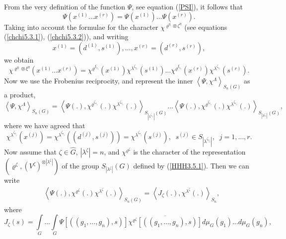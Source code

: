 \documentclass[12pt]{amsart}
\theoremstyle{definition}
\numberwithin{equation}{section}
\begin{document}
From the very definition of the function $\Psi$, see equation (\ref{PSI}), it follows that
\begin{equation}\label{PT1}
\Psi(x^{(1)}\ldots x^{(r)})=\Psi(x^{(1)})\ldots\Psi(x^{(r)}).
\end{equation}
Taking into account the formulae for the character $\chi^{\varrho^{\eta}\otimes\zeta^{\eta}}$ (see equations
(\ref{chchi5.3.1}), (\ref{chchi5.3.2})), and writing
$$
x^{(1)}=\left(d^{(1)},s^{(1)}\right),\ldots,x^{(r)}=\left(d^{(r)},s^{(r)}\right),
$$
we obtain
\begin{equation}
\chi^{\varrho^{\eta}\otimes\xi^{\eta}}\left(x^{(1)}\ldots x^{(r)}\right)=\chi^{\varrho^{\xi_{\tau_1}}}(x^{(1)})
\chi^{\lambda^{\zeta_{\tau_1}}}(s^{(1)})\ldots
\chi^{\varrho^{\xi_{\tau_r}}}(x^{(r)})
\chi^{\lambda^{\zeta_{\tau_r}}}(s^{(r)}).
\end{equation}
Now we use the Frobenius reciprocity, and represent the inner
$\left<\Psi,\chi^{\Lambda}\right>_{S_n(G)}$ as  a product,
\begin{equation}\label{PT3}
\left<\Psi,\chi^{\Lambda}\right>_{S_n(G)}=\left<\Psi(.),\chi^{\varrho^{\zeta_{\tau_1}}}(.)\chi^{\lambda^{\zeta_{\tau_1}}}(.)\right>_{S_{|\lambda^{\zeta_{\tau_1}}|}(G)}\ldots
\left<\Psi(.),\chi^{\varrho^{\zeta_{\tau_r}}}(.)\chi^{\lambda^{\zeta_{\tau_r}}}(.)\right>_{S_{|\lambda^{\zeta_r}|}(G)},
\end{equation}
where we have agreed that
$$
\chi^{\lambda^{\zeta_{\tau_j}}}(x^{(j)})=\chi^{\lambda^{\zeta_{\tau_j}}}\left(
\left(d^{(j)},s^{(j)}\right)\right)=\chi^{\lambda^{\zeta_{\tau_j}}}\left(s^{(j)}\right),\;\; s^{(j)}\in S_{|\lambda^{\zeta_{\tau_j}}|},\;\; j=1,\ldots,r.
$$
Now assume that $\zeta\in\widehat{G}$, $|\lambda^{\zeta}|=n$, and
$\chi^{\varrho^{\zeta}}$ is the character of the representation
$\left(\varrho^{\zeta},\left(V^{\zeta}\right)^{\otimes |\lambda^{\zeta}|}\right)$ of the group
$S_{|\lambda^{\zeta}|}(G)$ defined by (\ref{HHH3.5.1}). Then
we can write
\begin{equation}\label{PT4}
\begin{split}
&\left<\Psi(.),\chi^{\varrho^{\zeta}}(.)\chi^{\lambda^{\zeta}}(.)\right>_{S_{n}(G)}=\left<J_{\zeta}(.),\chi^{\lambda^{\zeta}}(.)\right>_{S_n},
\end{split}
\end{equation}
where
\begin{equation}\label{PT5}
J_{\zeta}(s)=\int\limits_{G}\ldots\int\limits_{G}
\Psi\left[\left((g_1,\ldots,g_n),s\right)\right]
\overline{\chi^{\varrho^{\zeta}}\left[\left((g_1,\ldots,g_n),s\right)\right]}
d\mu_G(g_1)\ldots d\mu_{G}(g_n),
\end{equation}
\end{document}
